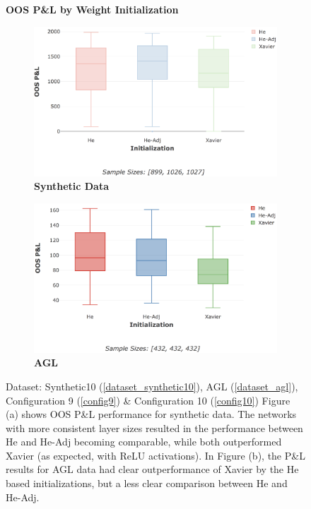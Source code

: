 \documentclass[a4paper,11pt,oneside]{article}
\theoremstyle{plain}
\theoremstyle{definition}
\begin{document}
	
	\begin{figure}[H]
		\centering
		\textbf{OOS P\&L by Weight Initialization}
		\begin{subfigure}{.5\textwidth}
			\centering 
			\includegraphics[scale=0.28]{images/results/8_4_weight_init/synth_pl_init.png}
			\caption{\textbf{Synthetic Data} 
				\newline }
			\label{figure-synthetic_pl_init}
		\end{subfigure}%
		\begin{subfigure}{.5\textwidth}
			\centering 
			\includegraphics[scale=0.28]{images/results/8_4_weight_init/agl_pl_init.png}
			\caption{\textbf{AGL} 
				\newline }
			\label{figure-agl_pl_init}
		\end{subfigure}
		\caption[OOS P\&L by Weight Initialization]
		{Dataset: Synthetic10 (\ref{dataset_synthetic10}), AGL (\ref{dataset_agl}), Configuration 9 (\ref{config9}) \& Configuration 10 (\ref{config10})
			\newline Figure (a) shows OOS P\&L performance for synthetic data. The networks with more consistent layer sizes resulted in the performance between He and He-Adj becoming comparable, while both outperformed Xavier (as expected, with ReLU activations). In Figure (b), the P\&L results for AGL data had clear outperformance of Xavier by the He based initializations, but a less clear comparison between He and He-Adj.}
		\label{figure-pl_init}
	\end{figure}
	
\end{document}
